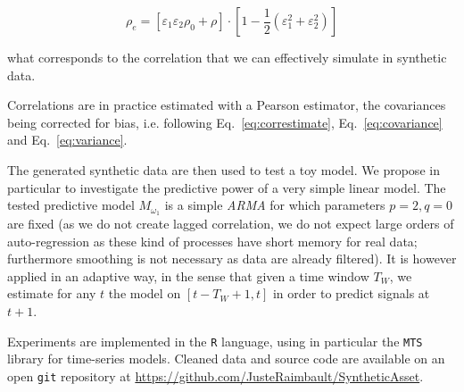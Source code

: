 \documentclass{article}
\begin{document}
\begin{equation}
\label{eq:eff_corr}
\rho_e = \left[ \varepsilon_1 \varepsilon_2 \rho_0 + \rho \right] \cdot \left[ 1 - \frac{1}{2}\left(\varepsilon_1^2 + \varepsilon_2^2 \right) \right]
\end{equation}

{\noindent}what corresponds to the correlation that we can effectively simulate in synthetic data.

Correlations are in practice estimated with a Pearson estimator, the covariances being corrected for bias, i.e. following Eq.~\ref{eq:correstimate}, Eq.~\ref{eq:covariance} and Eq.~\ref{eq:variance}.


The generated synthetic data are then used to test a toy model. We propose in particular to investigate the predictive power of a very simple linear model. The tested predictive model $M_{\omega_1}$ is a simple \emph{ARMA} for which parameters $p=2,q=0$ are fixed (as we do not create lagged correlation, we do not expect large orders of auto-regression as these kind of processes have short memory for real data; furthermore smoothing is not necessary as data are already filtered). It is however applied in an adaptive way, in the sense that given a time window $T_W$, we estimate for any $t$ the model on $[t-T_W+1,t]$ in order to predict signals at $t+1$.


Experiments are implemented in the \texttt{R} language, using in particular the \texttt{MTS}~\cite{Tsay:2015xy} library for time-series models. Cleaned data and source code are available on an open \texttt{git} repository at \url{https://github.com/JusteRaimbault/SyntheticAsset}.
\end{document}
